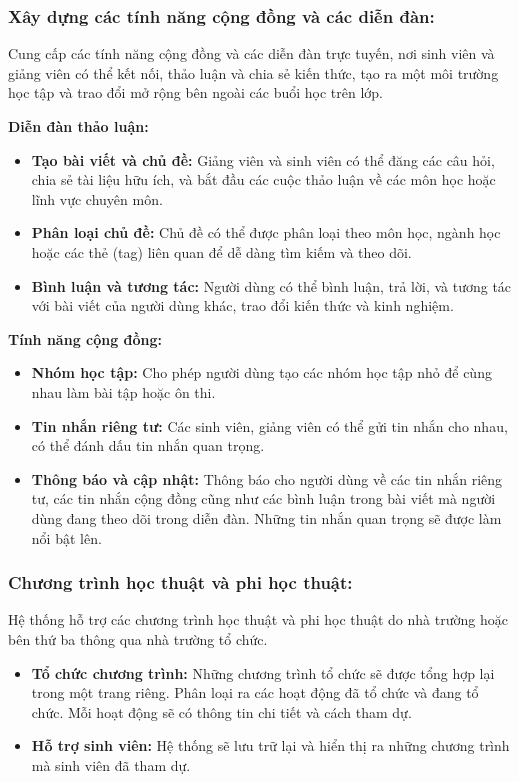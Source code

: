\subsubsection{Xây dựng các tính năng cộng đồng và các diễn đàn:}
Cung cấp các tính năng cộng đồng và các diễn đàn trực tuyến, nơi sinh viên và giảng viên có thể kết nối, thảo luận và chia sẻ kiến thức, tạo ra một môi trường học tập và trao đổi mở rộng bên ngoài các buổi học trên lớp. 

\textbf{Diễn đàn thảo luận:}
\begin{itemize}
    \item \textbf{Tạo bài viết và chủ đề:}
    Giảng viên và sinh viên có thể đăng các câu hỏi, chia sẻ tài liệu hữu ích, và bắt đầu các cuộc thảo luận về các môn học hoặc lĩnh vực chuyên môn.
    
    \item \textbf{Phân loại chủ đề:}
    Chủ đề có thể được phân loại theo môn học, ngành học hoặc các thẻ (tag) liên quan để dễ dàng tìm kiếm và theo dõi.

    \item \textbf{Bình luận và tương tác:}
    Người dùng có thể bình luận, trả lời, và tương tác với bài viết của người dùng khác, trao đổi kiến thức và kinh nghiệm.
\end{itemize}

\textbf{Tính năng cộng đồng:}
\begin{itemize}
    \item \textbf{Nhóm học tập:}
    Cho phép người dùng tạo các nhóm học tập nhỏ để cùng nhau làm bài tập hoặc ôn thi.

    \item \textbf{Tin nhắn riêng tư:}
    Các sinh viên, giảng viên có thể gửi tin nhắn cho nhau, có thể đánh dấu tin nhắn quan trọng.

    \item \textbf{Thông báo và cập nhật:}
    Thông báo cho người dùng về các tin nhắn riêng tư, các tin nhắn cộng đồng cũng như các bình luận trong bài viết mà người dùng đang theo dõi trong diễn đàn. Những tin nhắn quan trọng sẽ được làm nổi bật lên.
\end{itemize}

\subsubsection{Chương trình học thuật và phi học thuật:}
Hệ thống hỗ trợ các chương trình học thuật và phi học thuật do nhà trường hoặc bên thứ ba thông qua nhà trường tổ chức.
\begin{itemize}
    \item \textbf{Tổ chức chương trình:}
    Những chương trình tổ chức sẽ được tổng hợp lại trong một trang riêng. Phân loại ra các hoạt động đã tổ chức và đang tổ chức. Mỗi hoạt động sẽ có thông tin chi tiết và cách tham dự.

    \item \textbf{Hỗ trợ sinh viên:}
    Hệ thống sẽ lưu trữ lại và hiển thị ra những chương trình mà sinh viên đã tham dự.
\end{itemize}

